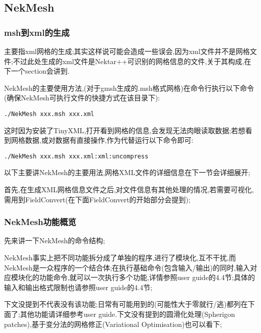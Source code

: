 \subsection{NekMesh}

\subsubsection{msh到xml的生成}
主要指xml网格的生成;其实这样说可能会造成一些误会,因为xml文件并不是网格文件;不过此处生成的xml文件是Nektar++可识别的网格信息的文件,关于其构成,在下一个section会讲到.\par
NekMesh的主要使用方法,(对于gmsh生成的.msh格式网格)在命令行执行以下命令(确保NekMesh可执行文件的快捷方式在该目录下):

\begin{lstlisting}[frame=single]
	./NekMesh xxx.msh xxx.xml
\end{lstlisting}
\par

这时因为安装了TinyXML,打开看到网格的信息,会发现无法肉眼读取数据;若想看到网格数据,或对数据有直接操作,作为代替运行以下命令即可:
\begin{lstlisting}[frame=single]
	./NekMesh xxx.msh xxx.xml:xml:uncompress
\end{lstlisting}
\par
以下主要讲NekMesh的主要用法,网格XML文件的详细信息在下一节会详细展开;\par

首先,在生成XML网格信息文件之后,对文件信息有其他处理的情况,若需要可视化,需用到FieldConvert(在下面FieldConvert的开始部分会提到);

\subsubsection{NekMesh功能概览}
先来讲一下NekMesh的命令结构;\par
NekMesh事实上把不同功能拆分成了单独的程序,进行了模块化,互不干扰,而NekMesh是一众程序的一个结合体;在执行基础命令(包含输入/输出)的同时,输入对应模块化的功能命令,就可以一次执行多个功能,详情参照user guide的4.4节;具体的输入和输出格式限制也请参照user guide的4.4节;\par
下文没提到不代表没有该功能;日常有可能用到的(可能性大于零就行/逃)都列在下面了;其他功能请详细参考user guide.下文没有提到的圆滑化处理(Spherigon patches),基于变分法的网格修正(Variational Optimisation)也可以看下;\par

